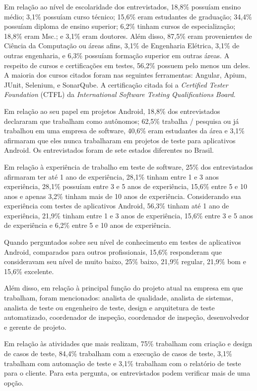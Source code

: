 Em relação ao nível de escolaridade dos entrevistados, 18,8\% possuíam ensino médio; 3,1\% possuíam curso técnico; 15,6\% eram estudantes de graduação; 34,4\% possuíam diploma de ensino superior; 6,2\% tinham cursos de especialização; 18,8\%
eram Msc.; e 3,1\% eram doutores. Além disso, 87,5\% eram provenientes de Ciência da Computação ou áreas afins, 3,1\% de Engenharia Elétrica, 3,1\% de outras engenharia, e 6,3\% possuíam formação superior em outras áreas. A respeito de cursos e certificações em testes, 56,2\% possuem pelo menos um deles. A maioria dos cursos citados foram nas seguintes ferramentas: Angular, Apium, JUnit, Selenium, e SonarQube. A certificação citada foi a \textit{Certified Tester Foundation} (CTFL) da \textit{International Software Testing Qualifications Board}.

Em relação ao seu papel em projetos Android, 18,8\% dos entrevistados declararam que trabalham como autônomos; 62,5\% trabalha / pesquisa ou já trabalhou em uma empresa de software, 40,6\% eram estudantes da área e 3,1\% afirmaram que
eles nunca trabalharam em projetos de teste para aplicativos Android. Os entrevistados foram de sete estados diferentes no Brasil.

Em relação à experiência de trabalho em teste de software, 25\% dos entrevistados afirmaram ter até 1 ano de experiência, 28,1\% tinham entre 1 e 3 anos experiência, 28,1\% possuíam entre 3 e 5 anos de experiência, 15,6\% entre 5 e 10 anos e apenas 3,2\% tinham mais de 10 anos de experiência. Considerando sua experiência com testes de aplicativos Android, 56,3\% tinham até 1 ano de experiência, 21,9\% tinham entre 1 e 3 anos de experiência, 15,6\% entre 3 e 5 anos de experiência e 6,2\% entre 5 e 10 anos de experiência.

Quando perguntados sobre seu nível de conhecimento em testes de aplicativos Android, comparados para outros profissionais, 15,6\% responderam que consideravam seu nível de
muito baixo, 25\% baixo, 21,9\% regular, 21,9\% bom e 15,6\% excelente.

Além disso, em relação à principal função do projeto atual na empresa em que trabalham, foram mencionados: analista de qualidade, analista de sistemas, analista de teste ou engenheiro de teste, design e arquitetura de teste automatizado, coordenador de inspeção, coordenador de inspeção, desenvolvedor e gerente de projeto.

Em relação às atividades que mais realizam, 75\% trabalham com criação e design de casos de teste, 84,4\% trabalham com a execução de casos de teste, 3,1\% trabalham com automação de teste e 3,1\% trabalham com o relatório de teste para o cliente. Para esta pergunta, os entrevistados podem verificar mais de uma opção.

